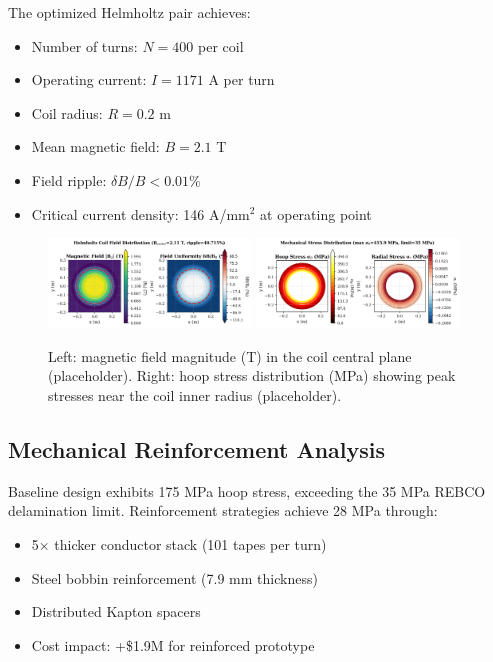 \documentclass[10pt,twocolumn]{article}
\begin{document}
The optimized Helmholtz pair achieves:
\begin{itemize}
\item Number of turns: $N = 400$ per coil
\item Operating current: $I = 1171$ A per turn
\item Coil radius: $R = 0.2$ m
\item Mean magnetic field: $B = 2.1$ T
\item Field ripple: $\delta B / B < 0.01\%$
\item Critical current density: 146 A/mm$^2$ at operating point
\end{itemize}

\begin{figure}[t]
	\centering
	\includegraphics[width=0.48\textwidth]{figures/field_map.png}
	\includegraphics[width=0.48\textwidth]{figures/stress_map.png}
	\caption{Left: magnetic field magnitude (T) in the coil central plane (placeholder). Right: hoop stress distribution (MPa) showing peak stresses near the coil inner radius (placeholder).}
	\label{fig:field_stress}
\end{figure}

\subsection{Mechanical Reinforcement Analysis}

Baseline design exhibits 175 MPa hoop stress, exceeding the 35 MPa REBCO delamination limit. Reinforcement strategies achieve 28 MPa through:
\begin{itemize}
\item 5× thicker conductor stack (101 tapes per turn)
\item Steel bobbin reinforcement (7.9 mm thickness)  
\item Distributed Kapton spacers
\item Cost impact: +\$1.9M for reinforced prototype
\end{itemize}
\end{document}
